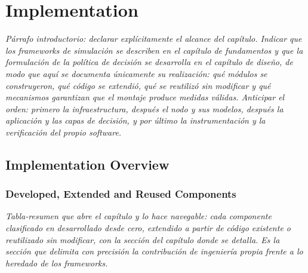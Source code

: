 \chapter{Implementation}

%

\emph{Párrafo introductorio: declarar explícitamente el alcance del capítulo.
Indicar que los frameworks de simulación se describen en el capítulo de
fundamentos y que la formulación de la política de decisión se desarrolla en el
capítulo de diseño, de modo que aquí se documenta únicamente su realización: qué
módulos se construyeron, qué código se extendió, qué se reutilizó sin modificar y
qué mecanismos garantizan que el montaje produce medidas válidas. Anticipar el
orden: primero la infraestructura, después el nodo y sus modelos, después la
aplicación y las capas de decisión, y por último la instrumentación y la
verificación del propio software.}

\section{Implementation Overview}

\subsection{Developed, Extended and Reused Components}
\emph{Tabla-resumen que abre el capítulo y lo hace navegable: cada componente
clasificado en desarrollado desde cero, extendido a partir de código existente o
reutilizado sin modificar, con la sección del capítulo donde se detalla. Es la
sección que delimita con precisión la contribución de ingeniería propia frente a
lo heredado de los frameworks.}

